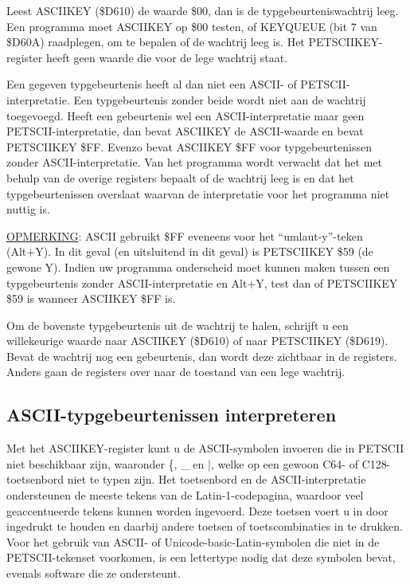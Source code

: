 Leest ASCIIKEY (\$D610) de waarde \$00, dan is de typgebeurteniswachtrij leeg. Een programma moet ASCIIKEY op \$00 testen, of KEYQUEUE (bit 7 van \$D60A) raadplegen, om te bepalen of de wachtrij leeg is. Het PETSCIIKEY-register heeft geen waarde die voor de lege wachtrij staat.

Een gegeven typgebeurtenis heeft al dan niet een ASCII- of PETSCII-interpretatie. Een typgebeurtenis zonder beide wordt niet aan de wachtrij toegevoegd. Heeft een gebeurtenis wel een ASCII-interpretatie maar geen PETSCII-interpretatie, dan bevat ASCIIKEY de ASCII-waarde en bevat PETSCIIKEY \$FF. Evenzo bevat ASCIIKEY \$FF voor typgebeurtenissen zonder ASCII-interpretatie. Van het programma wordt verwacht dat het met behulp van de overige registers bepaalt of de wachtrij leeg is en dat het typgebeurtenissen overslaat waarvan de interpretatie voor het programma niet nuttig is.

\underline{OPMERKING}: ASCII gebruikt \$FF eveneens voor het ``umlaut-y''-teken (Alt+Y). In dit geval (en uitsluitend in dit geval) is PETSCIIKEY \$59 (de gewone Y). Indien uw programma onderscheid moet kunnen maken tussen een typgebeurtenis zonder ASCII-interpretatie en Alt+Y, test dan of PETSCIIKEY \$59 is wanneer ASCIIKEY \$FF is.

Om de bovenste typgebeurtenis uit de wachtrij te halen, schrijft u een willekeurige waarde naar ASCIIKEY (\$D610) of naar PETSCIIKEY (\$D619). Bevat de wachtrij nog een gebeurtenis, dan wordt deze zichtbaar in de registers. Anders gaan de registers over naar de toestand van een lege wachtrij.

\subsection{ASCII-typgebeurtenissen interpreteren}

Met het ASCIIKEY-register kunt u de ASCII-symbolen invoeren die in PETSCII niet beschikbaar zijn, waaronder \{, \_ en |, welke op een gewoon C64- of C128-toetsenbord niet te typen zijn. Het toetsenbord en de ASCII-interpretatie ondersteunen de meeste tekens van de Latin-1-codepagina, waardoor veel geaccentueerde tekens kunnen worden ingevoerd. Deze toetsen voert u in door \megasymbolkey ingedrukt te houden en daarbij andere toetsen of toetscombinaties in te drukken. Voor het gebruik van ASCII- of Unicode-basic-Latin-symbolen die niet in de PETSCII-tekenset voorkomen, is een lettertype nodig dat deze symbolen bevat, evenals software die ze ondersteunt.

